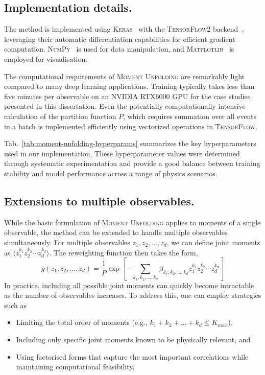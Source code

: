     \subsection{Implementation details.}
        The method is implemented using \textsc{Keras}~\cite{chollet2015keras} with the \textsc{TensorFlow2} backend~\cite{Abadi2016TensorFlow:Learning}, leveraging their automatic differentiation capabilities for efficient gradient computation.
        \textsc{NumPy}~\cite{Harris2020ArrayNumPy} is used for data manipulation, and \textsc{Matplotlib}~\cite{Hunter2007Matplotlib:Environment} is employed for visualisation.

        The computational requirements of \textsc{Moment Unfolding} are remarkably light compared to many deep learning applications.
        Training typically takes less than five minutes per observable on an NVIDIA RTX6000 GPU for the case studies presented in this dissertation.
       Even the potentially computationally intensive calculation of the partition function $P$, which requires summation over all events in a batch is implemented efficiently using vectorized operations in \textsc{TensorFlow}.

        Tab.~\ref{tab:moment-unfolding-hyperparams} summarizes the key hyperparameters used in our implementation.
        These hyperparameter values were determined through systematic experimentation and provide a good balance between training stability and model performance across a range of physics scenarios.



    \subsection{Extensions to multiple observables.}
        While the basic formulation of \textsc{Moment Unfolding} applies to moments of a single observable, the method can be extended to handle multiple observables simultaneously.
        For multiple observables $z_1, z_2, ..., z_d$, we can define joint moments as \(\langle z_1^{k_1} z_2^{k_2} \cdots z_d^{k_d} \rangle.\)
        The reweighting function then takes the form,
        \[
            g(z_1, z_2, ..., z_d) = \frac{1}{P}\exp\left[-\sum_{k_1, k_2, ..., k_d} \beta_{k_1, k_2, ..., k_d} z_1^{k_1} z_2^{k_2} \cdots z_d^{k_d}\right]
        \]
        In practice, including all possible joint moments can quickly become intractable as the number of observables increases.
        To address this, one can employ strategies such as
        \begin{itemize}
            \item Limiting the total order of moments (e.g., $k_1 + k_2 + ... + k_d \leq K_{max}$),
            \item Including only specific joint moments known to be physically relevant, and
            \item Using factorised forms that capture the most important correlations while maintaining computational feasibility.
        \end{itemize}
